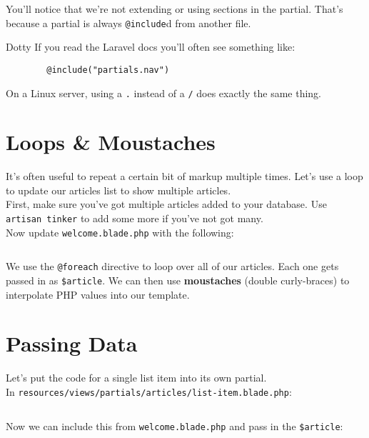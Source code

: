 You'll notice that we're not extending or using sections in the partial. That's because a partial is always \texttt{@include}d from another file.


\begin{infobox}{Dotty}
    If you read the Laravel docs you'll often see something like:

    \begin{verbatim}
        @include("partials.nav")
    \end{verbatim}

    On a Linux server, using a \texttt{.} instead of a \texttt{/} does exactly the same thing.
\end{infobox}



\section{Loops \& Moustaches}

It's often useful to repeat a certain bit of markup multiple times. Let's use a loop to update our articles list to show multiple articles.
\\

First, make sure you've got multiple articles added to your database. Use \texttt{artisan tinker} to add some more if you've not got many.
\\

Now update \texttt{welcome.blade.php} with the following:

\inputminted{html}{06-blade/figures/06-loop.blade.php}

We use the \texttt{@foreach} directive to loop over all of our articles. Each one gets passed in as \texttt{\$article}. We can then use \textbf{moustaches} (double curly-braces) to interpolate PHP values into our template.

\section{Passing Data}

Let's put the code for a single list item into its own partial.
\\

In \texttt{resources/views/partials/articles/list-item.blade.php}:

\inputminted{html}{06-blade/figures/07-list-item.blade.php}

Now we can include this from \texttt{welcome.blade.php} and pass in the \texttt{\$article}:

